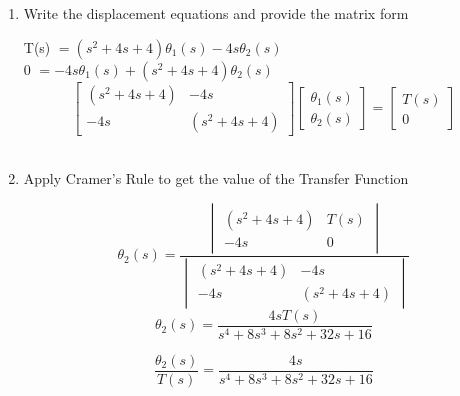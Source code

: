 ﻿\documentclass[11pt]{article}
\begin{document}
\begin{enumerate}[label=(\alph*),itemindent=*, leftmargin=*, nolistsep]
\vspace{15pt}
    \item Write the displacement equations and provide the matrix form
\begin{center}
    T(s) $= (s^2 + 4s + 4)\theta_1(s) - 4s\theta_2(s)$\\
    0 $= -4s\theta_1(s) + (s^2 + 4s + 4)\theta_2(s)$\\
    \[
        \begin{bmatrix}
        (s^2 + 4s + 4) & -4s \\
        -4s & (s^2 + 4s + 4)
        \end{bmatrix}
        \begin{bmatrix}
        \theta_1(s) \\
        \theta_2(s)
        \end{bmatrix}
        =
        \begin{bmatrix}
        T(s)\\
        0
        \end{bmatrix}
    \]\\
\end{center}
\vspace{15pt}
    \item Apply Cramer's Rule to get the value of the Transfer Function
\begin{center}
    \[
        \theta_2(s) = 
            \frac{\begin{vmatrix}
                (s^2 + 4s + 4) & T(s)\\
                -4s & 0
            \end{vmatrix}
        }{\begin{vmatrix}
                (s^2 + 4s + 4) & -4s \\
                -4s & (s^2 + 4s + 4)
            \end{vmatrix}
        }
    \]
    \[
    \theta_2(s) = \frac{4s T(s)}{s^4 + 8s^3 + 8s^2 + 32s + 16}
    \] 

    \[
    \boxed{\frac{\theta_2(s)}{T(s)} = \frac{4s}{s^4 + 8s^3 + 8s^2 + 32s + 16}}
    \] 

\end{center}
\end{enumerate}

\end{document}
